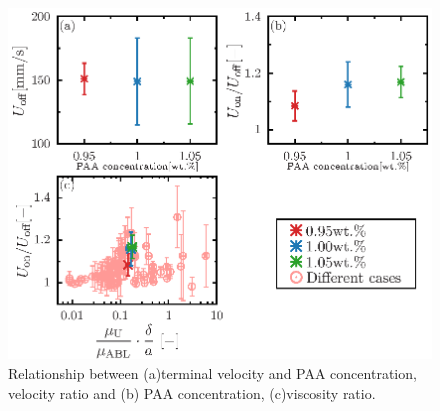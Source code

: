 \begin{figure}[H]
    \centering
    \includegraphics[width=1\textwidth]{X-Appendix/concentration_diff/concentration_diff_cal.eps}
    \caption{Relationship between (a)terminal velocity and PAA concentration, velocity ratio and (b) PAA concentration, (c)viscosity ratio.}
    \label{fig:95-105_cal}
\end{figure}
